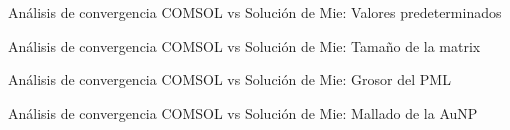 
\begin{frame}{Análisis de convergencia}
{COMSOL vs Solución de Mie: Valores predeterminados}\small
\begin{figure}
 	\centering
     \def\svgwidth{.9\textwidth}
\end{figure}
\end{frame}
%
%
\begin{frame}{Análisis de convergencia}
{COMSOL vs Solución de Mie: Tamaño de la matrix}\small
\begin{figure}
	\centering
     \def\svgwidth{.8\textwidth}
\end{figure}
\end{frame}


\begin{frame}{Análisis de convergencia}
{COMSOL vs Solución de Mie: Grosor del PML}\small
\begin{figure}
	\centering
     \def\svgwidth{.8\textwidth}
\end{figure}
\end{frame}

\begin{frame}{Análisis de convergencia}
{COMSOL vs Solución de Mie: Mallado de la AuNP}\small
\begin{figure}
	\centering
     \def\svgwidth{.8\textwidth}
\end{figure}
\end{frame}

